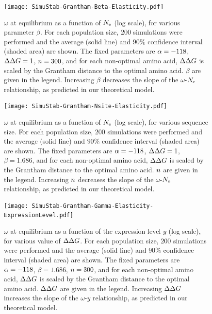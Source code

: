 \begin{figure}[H]
    \centering
    \texttt{[image: SimuStab-Grantham-Beta-Elasticity.pdf]}
    \caption[Effect of $\beta$ on the susceptibility]{
    $\omega$ at equilibrium as a function of $N_{\text{e}}$ (log scale), for various parameter $\beta$.
    For each population size, $200$ simulations were performed and the average (solid line) and $90\%$ confidence interval (shaded area) are shown.
    The fixed parameters are $\alpha=-118$, $\Delta \Delta G=1$, $n=300$, and for each non-optimal amino acid, $\DeltaDeltaG$ is scaled by the Grantham distance to the optimal amino acid. $\beta$ are given in the legend.
    Increasing $\beta$ decreases the slope of the $\omega$-$N_{\text{e}}$ relationship, as predicted in our theoretical model.
    }
\end{figure}

\begin{figure}[H]
    \centering
    \texttt{[image: SimuStab-Grantham-Nsite-Elasticity.pdf]}
    \caption[Effect of sequence size on the susceptibility]{
    $\omega$ at equilibrium as a function of $N_{\text{e}}$ (log scale), for various sequence size.
    For each population size, $200$ simulations were performed and the average (solid line) and $90\%$ confidence interval (shaded area) are shown.
    The fixed parameters are $\alpha=-118$, $\Delta \Delta G=1$, $\beta=1.686$, and for each non-optimal amino acid, $\DeltaDeltaG$ is scaled by the Grantham distance to the optimal amino acid. $n$ are given in the legend.
    Increasing $n$ decreases the slope of the $\omega$-$N_{\text{e}}$ relationship, as predicted in our theoretical model.
    }
\end{figure}

\begin{figure}[H]
    \centering
    \texttt{[image: SimuStab-Grantham-Gamma-Elasticity-ExpressionLevel.pdf]}
    \caption[Effect of $\DeltaDeltaG$ on the susceptibility with regards to expression level]{
    $\omega$ at equilibrium as a function of the expression level $y$ (log scale), for various value of $\DeltaDeltaG$.
    For each population size, $200$ simulations were performed and the average (solid line) and $90\%$ confidence interval (shaded area) are shown.
    The fixed parameters are $\alpha=-118$, $\beta=1.686$, $n=300$, and for each non-optimal amino acid, $\DeltaDeltaG$ is scaled by the Grantham distance to the optimal amino acid. $\DeltaDeltaG$ are given in the legend.
    Increasing $\DeltaDeltaG$ increases the slope of the $\omega$-$y$ relationship, as predicted in our theoretical model.
    }
\end{figure}

